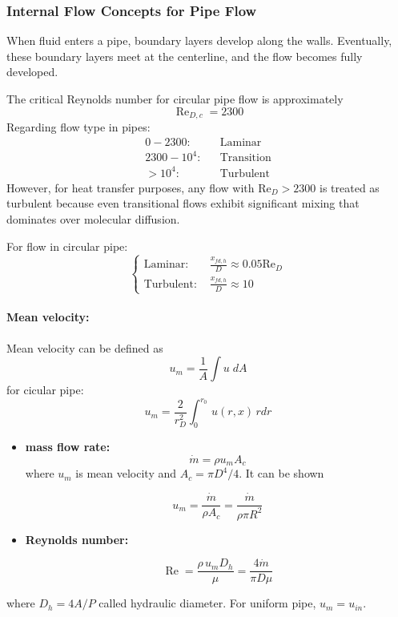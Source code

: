 \subsubsection*{Internal Flow Concepts for Pipe Flow}
When fluid enters a pipe, boundary layers develop along the walls. Eventually, these boundary layers meet at the centerline, and the flow becomes fully developed.

The critical Reynolds number for circular pipe flow is approximately 
\[
    \operatorname{Re}_{D,c} = 2300
\] 
%
Regarding flow type in pipes:
\[
    \begin{array}{rcl}
    0-2300: && \text{Laminar} 
    \\
    2300-10^{4}: && \text{Transition} 
    \\
    >10^{4} : && \text{Turbulent}
    \end{array}
\]
However, for heat transfer purposes, any flow with $\text{Re}_D > 2300$ is treated as turbulent because even transitional flows exhibit significant mixing that dominates over molecular diffusion.
%
\begin{definition}
    For flow in circular pipe:
    \[
        \left\{\begin{array}{ll}
             \text{Laminar: }&  \frac{x_{fd,h}}{D} \approx 0.05\text{Re}_D
             \\[1.5em]
             \text{Turbulent: }& \frac{x_{fd,h}}{D} \approx 10
        \end{array}
        \right.
    \]
\end{definition}
%
\paragraph{Mean velocity:} Mean velocity can be defined as 
\[
        u_m  = \frac{1}{A}\int u\; dA 
\]
for cicular pipe:
\[
        u_m   = \frac{2}{r^2_D}\int_0^{r_0}\,u(r,x)\, rdr        
\]
\begin{itemize}
    \item \textbf{mass flow rate:} 
    \[
            \dot{m} = \rho u_m A_c
    \]
    where $u_m$ is mean velocity and $A_c = \pi D^4/4$. It can be shown
    \begin{definition} 
        \[
            u_m = \frac{\dot{m}}{\rho A_c} = \frac{\dot{m}}{\rho \pi R^2}
        \]
    \end{definition}
    \item \textbf{Reynolds number:}
    \begin{definition}
    \[
        \operatorname{Re}=\frac{\rho \,u_m D_h}{\mu}=\frac{4 \dot{m}}{\pi D \mu}
    \]
    \end{definition}
\end{itemize}
%
where $D_h = 4A/P$ called hydraulic diameter. For uniform pipe, $u_m = u_{in}$.


